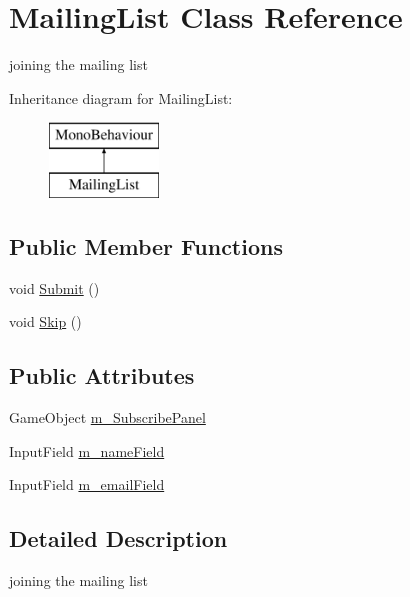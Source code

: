 \hypertarget{class_mailing_list}{}\section{Mailing\+List Class Reference}
\label{class_mailing_list}


joining the mailing list  


Inheritance diagram for Mailing\+List\+:\begin{figure}[H]
\begin{center}
\leavevmode
\includegraphics[height=2.000000cm]{class_mailing_list}
\end{center}
\end{figure}
\subsection*{Public Member Functions}
\begin{DoxyCompactItemize}
\item 
void \mbox{\hyperlink{class_mailing_list_af6124855f8ef9b921fab7289c2ebd6cb}{Submit}} ()
\item 
void \mbox{\hyperlink{class_mailing_list_a6f0bbe61dbb5c876e14b79be640fde98}{Skip}} ()
\end{DoxyCompactItemize}
\subsection*{Public Attributes}
\begin{DoxyCompactItemize}
\item 
Game\+Object \mbox{\hyperlink{class_mailing_list_aca8d46b50b49953f803c0c4f38328b59}{m\+\_\+\+Subscribe\+Panel}}
\item 
Input\+Field \mbox{\hyperlink{class_mailing_list_a50f154c98ab082a781ca81b873e26091}{m\+\_\+name\+Field}}
\item 
Input\+Field \mbox{\hyperlink{class_mailing_list_a361acc737c53d308383e9d9c658875ee}{m\+\_\+email\+Field}}
\end{DoxyCompactItemize}


\subsection{Detailed Description}
joining the mailing list 



